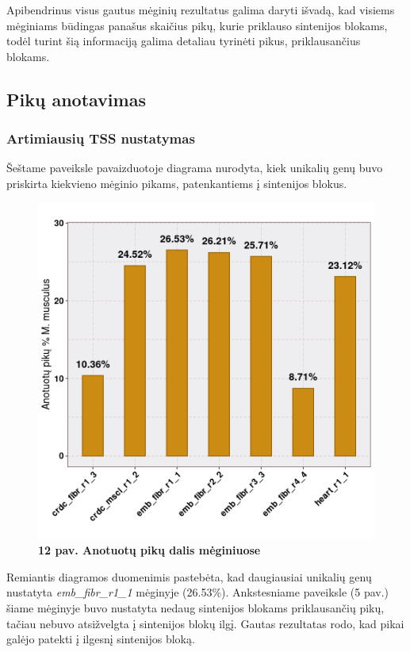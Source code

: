 \documentclass[12pt]{article}
\begin{document}
Apibendrinus visus gautus mėginių rezultatus galima daryti išvadą, kad visiems
mėginiams būdingas panašus skaičius pikų, kurie priklauso sintenijos blokams,
todėl turint šią informaciją galima detaliau tyrinėti pikus, priklausančius
blokams.

\subsection{Pikų anotavimas}
\subsubsection{Artimiausių TSS nustatymas}
Šeštame paveiksle pavaizduotoje diagrama nurodyta, kiek unikalių genų buvo
priskirta kiekvieno mėginio pikams, patenkantiems į sintenijos blokus.

\begin{figure}[htb]
    \begin{center}
        \includegraphics[width=0.7\linewidth]{../Figures/Unique_genes_MM.png}
        \vspace{-2\baselineskip}
        \caption*{\small\textbf{12 pav. Anotuotų pikų dalis mėginiuose}}
        \label{fig:birds}
    \end{center}
\end{figure}

Remiantis diagramos duomenimis pastebėta, kad daugiausiai unikalių genų
nustatyta \emph{emb\_fibr\_r1\_1} mėginyje (26.53\%). Ankstesniame paveiksle
(5 pav.) šiame mėginyje buvo nustatyta nedaug sintenijos blokams priklausančių
pikų, tačiau nebuvo atsižvelgta į sintenijos blokų ilgį. Gautas rezultatas rodo,
kad pikai galėjo patekti į ilgesnį sintenijos bloką.
\end{document}
